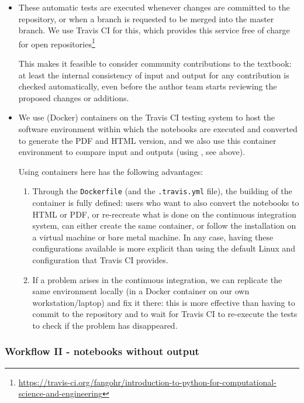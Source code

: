 \documentclass{deliverablereport}
\begin{document}
{{{\begin{itemize}
\item These automatic tests are executed whenever changes are
  committed to the repository, or when a branch is requested to be
  merged into the master branch. We use Travis CI for this, which
  provides this service free of charge for open repositories\footnote{\scriptsize
  \url{https://travis-ci.org/fangohr/introduction-to-python-for-computational-science-and-engineering}}

  This makes it feasible to consider community contributions to the
  textbook: at least the internal consistency of input and output for
  any contribution is checked automatically, even before the author
  team starts reviewing the proposed changes or additions.

\item We use (Docker) containers on the Travis CI testing system to
  host the software environment within which the notebooks are
  executed and converted to generate the PDF and HTML version, and we
  also use this container environment to compare input and outputs
  (using \nbval, see above).

  Using containers here has the following advantages:
  \begin{enumerate}
  \item Through the \texttt{Dockerfile} (and the \texttt{.travis.yml}
    file), the building of the container is fully defined: users who
    want to also convert the notebooks to HTML or PDF, or re-recreate
    what is done on the continuous integration system, can either
    create the same container, or follow the installation on a virtual
    machine or bare metal machine. In any case, having these
    configurations available is more explicit than using the default
    Linux and configuration that Travis CI provides.

  \item If a problem arises in the continuous integration, we can
    replicate the same environment locally (in a Docker container on
    our own workstation/laptop) and fix it there: this is more
    effective than having to commit to the repository and to wait for
    Travis CI to re-execute the tests to check if the problem has
    disappeared.

  \end{enumerate}

\end{itemize}


\subsubsection{Workflow II - notebooks without output}

}}}
\end{document}
